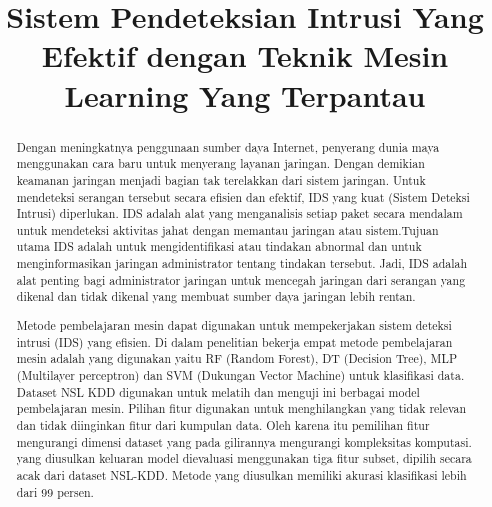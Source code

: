 \documentclass[conference]{IEEEtran}
\begin{document}
\title{Sistem Pendeteksian Intrusi Yang Efektif dengan Teknik Mesin Learning Yang Terpantau\\
}

\author{
}

\maketitle

\begin{abstract}
Dengan meningkatnya penggunaan sumber daya Internet, penyerang dunia maya menggunakan cara baru untuk menyerang layanan jaringan. Dengan demikian keamanan jaringan menjadi bagian tak terelakkan dari sistem jaringan. Untuk mendeteksi serangan tersebut secara efisien dan efektif, IDS yang kuat (Sistem Deteksi Intrusi) diperlukan. IDS adalah alat yang menganalisis setiap paket secara mendalam untuk mendeteksi aktivitas jahat dengan memantau jaringan atau sistem.Tujuan utama IDS adalah untuk mengidentifikasi atau tindakan abnormal dan untuk menginformasikan jaringan administrator tentang tindakan tersebut. Jadi, IDS adalah alat penting bagi administrator jaringan untuk mencegah jaringan dari serangan yang dikenal dan tidak dikenal yang membuat sumber daya jaringan lebih rentan. 

Metode pembelajaran mesin dapat digunakan untuk mempekerjakan sistem deteksi intrusi (IDS) yang efisien. Di dalam penelitian bekerja empat metode pembelajaran mesin adalah yang digunakan yaitu RF (Random Forest), DT (Decision Tree), MLP (Multilayer perceptron) dan SVM (Dukungan Vector Machine) untuk klasifikasi data. Dataset NSL KDD digunakan untuk melatih dan menguji ini berbagai model pembelajaran mesin. Pilihan fitur digunakan untuk menghilangkan yang tidak relevan dan tidak diinginkan fitur dari kumpulan data. Oleh karena itu pemilihan fitur mengurangi dimensi dataset yang pada gilirannya mengurangi kompleksitas komputasi. yang diusulkan keluaran model dievaluasi menggunakan tiga fitur subset, dipilih secara acak dari dataset NSL-KDD. Metode yang diusulkan memiliki akurasi klasifikasi lebih dari 99 persen.
\end{abstract}
\end{document}
